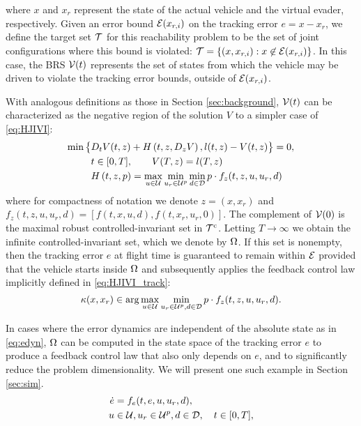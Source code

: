 where $x$ and $x_r$ represent the state of the actual vehicle and the virtual evader, respectively. Given an error bound $\mathcal{E}(x_{r,i})$ on the tracking error $e=x-x_r$, we define the target set $\mathcal{T}$ for this reachability problem to be the set of joint configurations where this bound is violated: $\mathcal{T} = \{(x, x_{r,i}): x\not\in\mathcal{E}(x_{r,i})\}$. In this case, the BRS $\mathcal{V}(t)$ represents the set of states from which the vehicle may be driven to violate the tracking error bounds, outside of $\mathcal{E}(x_{r,i})$.

With analogous definitions as those in Section \ref{sec:background}, $\mathcal{V}(t)$ can be characterized as the negative region of the solution $V$ to a simpler case of \eqref{eq:HJIVI}:
\vspace{-0.4em}
\begin{equation}
\label{eq:HJIVI_track}
\begin{aligned}
\min\big\{&D_t V(t, z) + H\left(t, z, D_z V\right), l(t,z) - V(t, z)\big\}= 0,\\
&t\in[0,T], \qquad V(T, z) = l(T, z) \\
&H\left(t, z, p\right) = \max_{u \in \mathcal{U}} \min_{u_r \in\mathcal{U}^p} \min_{d \in \mathcal{D}} p \cdot f_z(t,z,u,u_r,d)
\end{aligned}
\end{equation}
\noindent where for compactness of notation we denote $z=(x,x_r)$ and $f_z(t,z,u,u_r,d) = [f(t,x,u,d),f(t,x_r,u_r,0)]$. The complement of $\mathcal{V}(0)$ is the maximal robust controlled-invariant set in $\mathcal{T}^\text{c}$. Letting $T\to\infty$ we obtain the infinite controlled-invariant set, which we denote by $\Omega$. If this set is nonempty, then the tracking error $e$ at flight time is guaranteed to remain within $\mathcal{E}$ provided that the vehicle starts inside $\Omega$ and subsequently applies the feedback control law implicitly defined in \eqref{eq:HJIVI_track}:
\begin{equation}\label{eq:robust_tracking_law}
\kappa(x,x_r) \in \arg\max_{u \in \mathcal{U}} \min_{u_r \in\mathcal{U}^p, d \in \mathcal{D}} p \cdot f_z(t,z,u,u_r,d).
\end{equation}

In cases where the error dynamics are independent of the absolute state as in \eqref{eq:edyn}, $\Omega$ can be computed in the state space of the tracking error $e$ to produce a feedback control law that also only depends on $e$, and to significantly reduce the problem dimensionality. We will present one such example in Section \ref{sec:sim}.
\begin{equation}
\label{eq:edyn} %
\begin{aligned}
\dot{e} &= f_e(t, e, u, u_r,d), \\
u &\in \cset, u_r\in\cset^p, d \in \dset, \quad t \in [0, T],
\end{aligned}
\end{equation}

